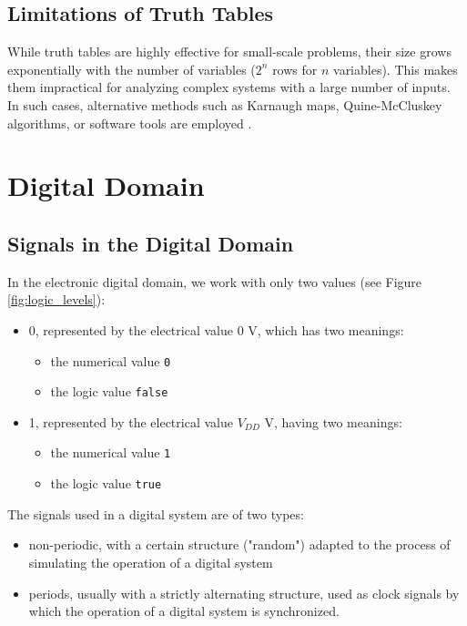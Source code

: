 \subsection{Limitations of Truth Tables}
While truth tables are highly effective for small-scale problems, their size grows exponentially with the number of variables (\( 2^n \) rows for \( n \) variables). This makes them impractical for analyzing complex systems with a large number of inputs. In such cases, alternative methods such as Karnaugh maps, Quine-McCluskey algorithms, or software tools are employed \cite{karnaugh1953, rosen2018}.


\section{Digital Domain}
\subsection{Signals in the Digital Domain}
In the electronic digital domain, we work with only two values (see Figure \ref{fig:logic_levels}):


\begin{itemize}
\item 0, represented by the electrical value 0 V, which has two meanings:
\begin{itemize}
\item the numerical value {\tt 0}
\item the logic value {\tt false}
\end{itemize}
\item 1, represented by the electrical value $V_{DD}$ V, having two meanings:
\begin{itemize}
\item the numerical value {\tt 1}
\item the logic value {\tt true}
\end{itemize}
\end{itemize}

The signals used in a digital system are of two types:
\begin{itemize}
\item non-periodic, with a certain structure ("random") adapted to the process of simulating the operation of a digital system
\item periods, usually with a strictly alternating structure, used as clock signals by which the operation of a digital system is synchronized.
\end{itemize}


